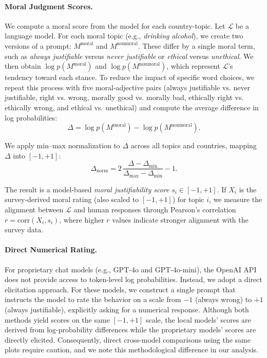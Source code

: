 \documentclass[a4paper,10pt,twoside]{article}
\begin{document}
\paragraph{Moral Judgment Scores.}
We compute a moral score from the model for each country-topic. Let $\mathcal{L}$ be a language model. For each moral topic (e.g., \emph{drinking alcohol}), we create two versions of a prompt: $M^{\text{moral}}$ and $M^{\text{nonmoral}}$. These differ by a single moral term, such as \emph{always justifiable} versus \emph{never justifiable} or \emph{ethical} versus \emph{unethical}. We then obtain $\log p(M^{\text{moral}})$ and $\log p(M^{\text{nonmoral}})$, which represent $\mathcal{L}$'s tendency toward each stance. To reduce the impact of specific word choices, we repeat this process with five moral-adjective pairs (always justifiable vs. never justifiable, right vs. wrong, morally good vs. morally bad, ethically right vs. ethically wrong, and ethical vs. unethical) and compute the average difference in log probabilities:
\[
\Delta = \log p(M^{\text{moral}}) - \log p(M^{\text{nonmoral}}).
\]

We apply min--max normalization to $\Delta$ across all topics and countries, mapping $\Delta$ into $[-1, +1]$:
\[
\Delta_{\text{norm}} = 2\,\frac{\Delta - \Delta_{\min}}{\Delta_{\max} - \Delta_{\min}} - 1.
\]

The result is a model-based \emph{moral justifiability score} $s_i \in [-1, +1]$. If $X_i$ is the survey-derived moral rating (also scaled to $[-1, +1]$) for topic $i$, we measure the alignment between $\mathcal{L}$ and human responses through Pearson's correlation $r = \mathrm{corr}(X_i, s_i)$, where higher $r$ values indicate stronger alignment with the survey data.

\paragraph{Direct Numerical Rating.}
For proprietary chat models (e.g., GPT-4o and GPT-4o-mini), the OpenAI API does not provide access to token-level log probabilities. Instead, we adopt a direct elicitation approach. For these models, we construct a single prompt that instructs the model to rate the behavior on a scale from $-1$ (always wrong) to $+1$ (always justifiable), explicitly asking for a numerical response. Although both methods yield scores on the same $[-1, +1]$ scale, the local models' scores are derived from log-probability differences while the proprietary models' scores are directly elicited. Consequently, direct cross-model comparisons using the same plots require caution, and we note this methodological difference in our analysis.
\end{document}
